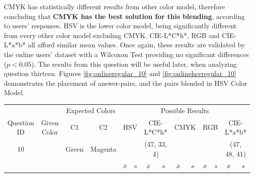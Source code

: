 CMYK has statistically different results from other color model, therefore concluding that \textbf{CMYK has the best solution for this blending}, according to
users' responses. HSV is the lower color model, being significantly different from every other color model excluding CMYK. CIE-L*C*h*, RGB and CIE-L*a*b* all afford similar mean values.
Once again, these results are validated by the online users' dataset with a Wilcoxon Test providing no significant differences ($p < 0.05$). The results from this question will be useful later, when
analyzing question thirteen. Figures \ref{fig:onlineregular_10} and \ref{fig:onlinehsvregular_10} demonstrates the placement of answer-pairs, and the pairs blended in HSV Color Model.
%
\begin{table}[htbp]
  \resizebox{\textwidth}{!} {
  \begin{tabular}{lccccccccccccc}
    \hline
    \multicolumn{1}{c}{}                              &                                      & \multicolumn{2}{c}{Expected Colors}                   & \multicolumn{10}{c}{Possible Results}                                                                                                                                                                                                                                                                                        \\ \cline{3-14}
    \multicolumn{1}{c}{\multirow{-2}{*}{Question ID}} & \multirow{-2}{*}{Given Color}        & C1                       & C2                         & \multicolumn{2}{c}{HSV}                                        & \multicolumn{2}{c}{CIE-L*C*h*}                                 & \multicolumn{2}{c}{CMYK}                                       & \multicolumn{2}{c}{RGB}                                        & \multicolumn{2}{c}{CIE-L*a*b*}                                 \\ \hline
    \multicolumn{1}{c}{10}                             & \cellcolor[HTML]{0080FF}{\color[HTML]{FFFFFF}(26, 23, 98)} & \multicolumn{1}{c|}{Green} & \multicolumn{1}{c|}{Magenta}  & \multicolumn{2}{c|}{\cellcolor[HTML]{0080FF}{\color[HTML]{FFFFFF}(26, 23, 98)}}      & \multicolumn{2}{c|}{\cellcolor[HTML]{FF6F00}(47, 33, 4)}       & \multicolumn{2}{c|}{\cellcolor[HTML]{808080}{\color[HTML]{FFFFFF}(21, 22, 24)}}       & \multicolumn{2}{c|}{\cellcolor[HTML]{808080}{\color[HTML]{FFFFFF}(21, 22, 24)}}       & \multicolumn{2}{c|}{\cellcolor[HTML]{C9B2A2}(47, 48, 41)}       \\ \hline
                                                      & \multicolumn{1}{l}{}                 & \multicolumn{1}{l}{}     & \multicolumn{1}{l}{}       & \multicolumn{1}{c}{$\overline{x}$} & \multicolumn{1}{c}{$s$} & \multicolumn{1}{c}{$\overline{x}$} & \multicolumn{1}{c}{$s$} & \multicolumn{1}{c}{$\overline{x}$} & \multicolumn{1}{c}{$s$} & \multicolumn{1}{c}{$\overline{x}$} & \multicolumn{1}{c}{$s$} & \multicolumn{1}{c}{$\overline{x}$} & \multicolumn{1}{c}{$s$} \\ \hline

\end{tabular}}
\end{table}
